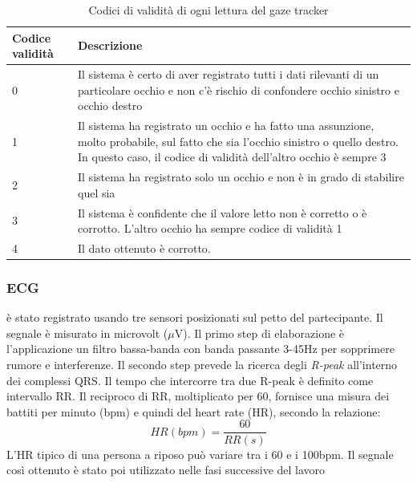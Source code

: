 \begin{table}[]
\begin{tabular}{p{}|p{}}
Codice validità   & Descrizione \\
\hline
0            & Il sistema è certo di aver registrato tutti i dati rilevanti di un particolare occhio
               e non c'è rischio di confondere occhio sinistro e occhio destro \\

1            & Il sistema ha registrato un occhio e ha fatto una assunzione,
               molto probabile, sul fatto che sia l'occhio sinistro o quello destro.
               In questo caso, il codice di validità dell'altro occhio è sempre 3 \\

2            & Il sistema ha registrato solo un occhio e non è in grado di stabilire quel sia \\

3            & Il sistema è confidente che il valore letto non è corretto o è corrotto.
               L'altro occhio ha sempre codice di validità 1 \\

4            & Il dato ottenuto è corrotto.  \\
\end{tabular}
\caption{Codici di validità di ogni lettura del gaze tracker}
\label{tab:gaze_validity_values}
\end{table}

\subsubsection{ECG}
è stato registrato usando tre sensori posizionati sul petto del partecipante. Il segnale è misurato in microvolt ($\mu$V).
Il primo step di elaborazione è l'applicazione un filtro bassa-banda con banda passante 3-45Hz per sopprimere rumore e interferenze.
Il secondo step prevede la ricerca degli \textit{R-peak} all'interno dei complessi QRS. Il tempo che intercorre tra due R-peak è definito come intervallo RR. Il reciproco di RR, moltiplicato per 60, fornisce una misura dei battiti per minuto (bpm) e quindi del heart rate (HR), secondo la relazione:
\begin{equation}
    HR(bpm) = \frac{60}{RR(s)}
\end{equation}
L'HR tipico di una persona a riposo può variare tra i 60 e i 100bpm.
Il segnale così ottenuto è stato poi utilizzato nelle fasi successive del lavoro

